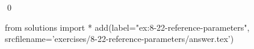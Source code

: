
\begin{ex}
  \label{ex:8-22-reference-parameters}
  
  \qed
\end{ex}
\begin{python0}
from solutions import *
add(label="ex:8-22-reference-parameters",
    srcfilename='exercises/8-22-reference-parameters/answer.tex')
\end{python0}
